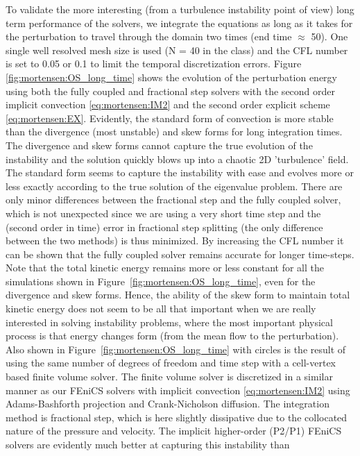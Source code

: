 To validate the more interesting (from a turbulence instability point
of view) long term performance of the solvers, we integrate the
equations as long as it takes for the perturbation to travel through
the domain two times (end time $\approx$ 50). One single well resolved
mesh size is used (N = 40 in the  class) and the CFL
number is set to 0.05 or 0.1 to limit the temporal discretization
errors. Figure \ref{fig:mortensen:OS_long_time} shows the evolution of
the perturbation energy using both the fully coupled and fractional
step solvers with the second order implicit convection
\eqref{eq:mortensen:IM2} and the second order explicit scheme
\eqref{eq:mortensen:EX}. Evidently, the standard form of convection
is more stable than the divergence (most unstable) and skew forms for
long integration times. The divergence and skew forms cannot capture
the true evolution of the instability and the solution quickly blows
up into a chaotic 2D 'turbulence' field. The standard form seems to
capture the instability with ease and evolves more or less exactly
according to the true solution of the eigenvalue problem. There are
only minor differences between the fractional step and the fully
coupled solver, which is not unexpected since we are using a very
short time step and the (second order in time) error in fractional step
splitting (the only difference between the two methods) is thus
minimized. By increasing the CFL number it can be shown that the fully
coupled solver remains accurate for longer time-steps. Note that the
total kinetic energy remains more or less constant for all the
simulations shown in Figure~\ref{fig:mortensen:OS_long_time}, even for
the divergence and skew forms. Hence, the ability of the skew form to
maintain total kinetic energy does not seem to be all that important
when we are really interested in solving instability problems, where
the most important physical process is that energy changes form (from
the mean flow to the perturbation). Also shown in
Figure~\ref{fig:mortensen:OS_long_time} with circles is the result of
using the same number of degrees of freedom and time step with a
cell-vertex based finite volume solver. The finite volume solver is
discretized in a similar manner as our FEniCS solvers with implicit
convection \eqref{eq:mortensen:IM2} using Adams-Bashforth projection
and Crank-Nicholson diffusion. The integration method is fractional
step, which is here slightly dissipative due to the collocated nature
of the pressure and velocity. The implicit higher-order (P2/P1) FEniCS
solvers are evidently much better at capturing this instability than
